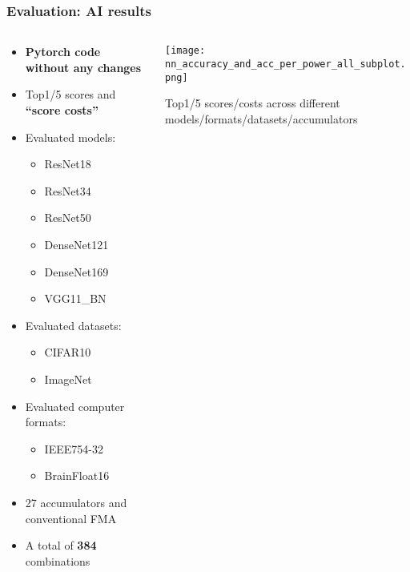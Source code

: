 \begin{frame}
\frametitle{Evaluation: AI results}

\begin{columns}

\begin{column}{0.4\textwidth}
\tiny
\begin{itemize}
	\item<1-> \textbf{Pytorch code without any changes}
	\item<1-> Top1/5 scores and \textbf{``score costs''}
	\vspace{3mm}
    \item<2-> Evaluated models:
        \begin{itemize}
\tiny
            \item ResNet18
            \item ResNet34
            \item ResNet50
            \item DenseNet121
            \item DenseNet169
            \item VGG11\_BN
        \end{itemize}
    \item<3-> Evaluated datasets:
        \begin{itemize}
\tiny
            \item CIFAR10
            \item ImageNet
        \end{itemize}
    \item<4-> Evaluated computer formats:
        \begin{itemize}
\tiny
            \item IEEE754-32
            \item BrainFloat16
        \end{itemize}
    \item<5-> 27 accumulators and conventional FMA
    \item<5-> A total of \textbf{384} combinations
\end{itemize}
\end{column}

\begin{column}{0.6\textwidth}
\tiny
\centering
\texttt{[image: nn\_accuracy\_and\_acc\_per\_power\_all\_subplot.png]}
\caption{Top1/5 scores/costs across different models/formats/datasets/accumulators}
\end{column}

\end{columns}
\normalsize
\end{frame}

